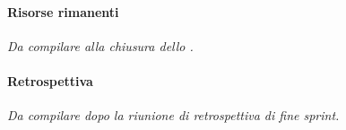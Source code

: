 \documentclass[documento]{gpt}
\newcommand{\subsubsubsection}[1]{\paragraph{#1}}
\begin{document}
\subsubsubsection{Risorse rimanenti}
\textit{Da compilare alla chiusura dello .}


\subsubsubsection{Retrospettiva}
\textit{Da compilare dopo la riunione di retrospettiva di fine sprint.}

\end{document}

